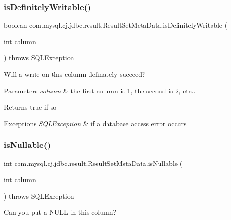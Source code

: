 \subsubsection{\texorpdfstring{is\+Definitely\+Writable()}{isDefinitelyWritable()}}
{\footnotesize\ttfamily boolean com.\+mysql.\+cj.\+jdbc.\+result.\+Result\+Set\+Meta\+Data.\+is\+Definitely\+Writable (\begin{DoxyParamCaption}\item[{int}]{column }\end{DoxyParamCaption}) throws S\+Q\+L\+Exception}

Will a write on this column definately succeed?


\begin{DoxyParams}{Parameters}
{\em column} & the first column is 1, the second is 2, etc..\\
\hline
\end{DoxyParams}
\begin{DoxyReturn}{Returns}
true if so
\end{DoxyReturn}

\begin{DoxyExceptions}{Exceptions}
{\em S\+Q\+L\+Exception} & if a database access error occurs \\
\hline
\end{DoxyExceptions}
\mbox{\label{classcom_1_1mysql_1_1cj_1_1jdbc_1_1result_1_1_result_set_meta_data_aa43c80c47922375a72afe54e7a56c865}} 
\subsubsection{\texorpdfstring{is\+Nullable()}{isNullable()}}
{\footnotesize\ttfamily int com.\+mysql.\+cj.\+jdbc.\+result.\+Result\+Set\+Meta\+Data.\+is\+Nullable (\begin{DoxyParamCaption}\item[{int}]{column }\end{DoxyParamCaption}) throws S\+Q\+L\+Exception}

Can you put a N\+U\+LL in this column?


